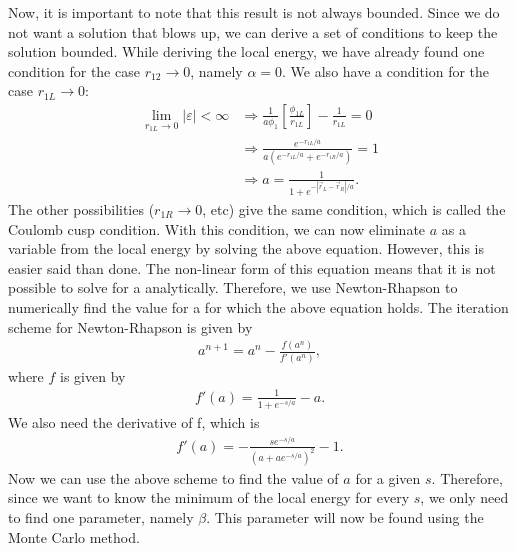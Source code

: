Now, it is important to note that this result is not always bounded. Since we do not want a solution that blows up, we can derive a set of conditions to keep the solution bounded. While deriving the local energy, we have already found one condition for the case $r_{12}\rightarrow0$, namely $\alpha=0$.
We also have a condition for the case $r_{1L}\rightarrow0$:
\begin{align}
\mathop {\lim }\limits_{{r_{1L}} \to 0} \left| \varepsilon  \right| < \infty  &\Rightarrow \frac{1}{{a{\phi _1}}}\left[ {\frac{{{\phi _{1L}}}}{{{r_{1L}}}}} \right] - \frac{1}{{{r_{1L}}}} = 0\nonumber\\& \Rightarrow \frac{{{e^{ - {r_{1L}}/a}}}}{{a\left( {{e^{ - {r_{1L}}/a}} + {e^{ - {r_{1R}}/a}}} \right)}} = 1\nonumber\\&
 \Rightarrow a = \frac{1}{{1 + {e^{ - \left| {{{\vec r}_L} - {{\vec r}_R}} \right|/a}}}}.
\end{align}
The other possibilities ($r_{1R}\rightarrow0$, etc) give the same condition, which is called the Coulomb cusp condition. With this condition, we can now eliminate $a$ as a variable from the local energy by solving the above equation.
However, this is easier said than done. The non-linear form of this equation means that it is not possible to solve for a analytically. Therefore, we use Newton-Rhapson to numerically find the value for a for which the above equation holds.
\noindent The iteration scheme for Newton-Rhapson is given by
\begin{align}
{a^{n + 1}} = {a^n} - \frac{{f\left( {{a^n}} \right)}}{{f'\left( {{a^n}} \right)}},
\end{align}
where $f$ is given by
\begin{align}
f'\left( a \right) = \frac{1}{{1 + {e^{ - s/a}}}} - a.
\end{align}
We also need the derivative of f, which is
\begin{align}
f'\left( a \right) =  - \frac{{s{e^{ - s/a}}}}{{{{\left( {a + a{e^{ - s/a}}} \right)}^2}}} - 1.
\end{align}
Now we can use the above scheme to find the value of $a$ for a given $s$. Therefore, since we want to know the minimum of the local energy for every $s$, we only need to find one parameter, namely $\beta$. This parameter will now be found using the Monte Carlo method. 
